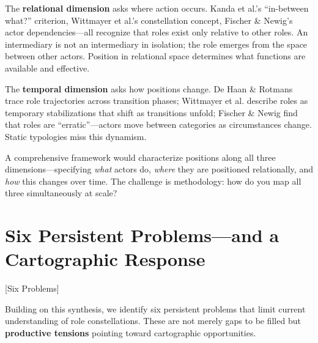 \documentclass[../main.tex]{subfiles}
\begin{document}
The \textbf{relational dimension} asks where action occurs. Kanda et al.'s ``in-between what?'' criterion, Wittmayer et al.'s constellation concept, Fischer \& Newig's actor dependencies---all recognize that roles exist only relative to other roles. An intermediary is not an intermediary in isolation; the role emerges from the space between other actors. Position in relational space determines what functions are available and effective.

The \textbf{temporal dimension} asks how positions change. De Haan \& Rotmans trace role trajectories across transition phases; Wittmayer et al. describe roles as temporary stabilizations that shift as transitions unfold; Fischer \& Newig find that roles are ``erratic''---actors move between categories as circumstances change. Static typologies miss this dynamism.

A comprehensive framework would characterize positions along all three dimensions---specifying \textit{what} actors do, \textit{where} they are positioned relationally, and \textit{how} this changes over time. The challenge is methodology: how do you map all three simultaneously at scale?


\section{Six Persistent Problems---and a Cartographic Response}[Six Problems]

Building on this synthesis, we identify six persistent problems that limit current understanding of role constellations. These are not merely gaps to be filled but \textbf{productive tensions} pointing toward cartographic opportunities.
\end{document}
